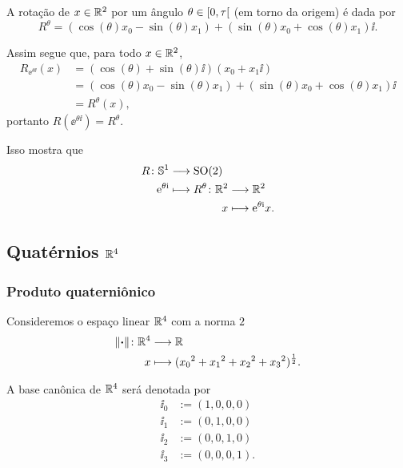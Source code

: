 A rotação de $x \in \mathbb{R}^2$ por um ângulo $\theta \in \left[{0},{\tau}\right[$ (em torno da origem) é dada por
	\begin{equation*}
	R^\theta = (\cos(\theta)x_0 - \sin(\theta)x_1) + (\sin(\theta)x_0 + \cos(\theta)x_1) \ii.
	\end{equation*}

Assim segue que, para todo $x \in \mathbb{R}^2$,
	\begin{align*}
	R_{\ee^{\theta \ii}}(x) &= (\cos(\theta) + \sin(\theta)\ii)(x_0 + x_1 \ii) \\
		&= (\cos(\theta)x_0 - \sin(\theta)x_1) + (\sin(\theta)x_0 + \cos(\theta)x_1) \ii \\
		&= R^\theta(x),
	\end{align*}
portanto $R(\ee^{\theta \ii}) = R^{\theta}$.

Isso mostra que
	\begin{align*}
	\func{R}{\S^1}{\SO(2)}{\ee^{\theta \ii}}{
		\begin{aligned}[t]
			\func{R^{\theta}}{\R^2}{\R^2}{x}{\ee^{\theta \ii} x}.
		\end{aligned}
	}
	\end{align*}



\subsection{Quatérnios $\mathbb{R}^4$}

\subsubsection{Produto quaterniônico}

Consideremos o espaço linear $\mathbb{R}^4$ com a norma $2$
	\begin{align*}
	{\left\Vert{\bm{\cdot}}\right\Vert}\colon {\mathbb{R}^4} &\longrightarrow {\mathbb{R}} \\{x} &\longmapsto ({x_0}^2+{x_1}^2+{x_2}^2+{x_3}^2)^{\frac{1}{2}}.
	\end{align*}

A base canônica de $\mathbb{R}^4$ será denotada por
	\begin{align*}
	\ii_0 &:= (1,0,0,0) \\
	\ii_1 &:= (0,1,0,0) \\
	\ii_2 &:= (0,0,1,0) \\
	\ii_3 &:= (0,0,0,1).
	\end{align*}

